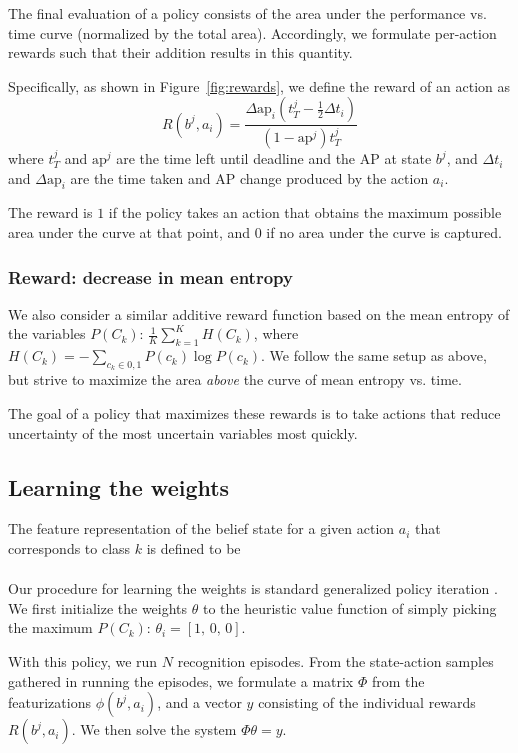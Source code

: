 The final evaluation of a policy consists of the area under the performance vs. time curve (normalized by the total area).
Accordingly, we formulate per-action rewards such that their addition results in this quantity.

Specifically, as shown in Figure~\ref{fig:rewards}, we define the reward of an action as
\begin{equation}\label{eq:advanced}
R(b^j,a_i) = \frac{\Delta \text{ap}_i (t_T^j-\frac{1}{2}\Delta t_i)}{(1-\text{ap}^j)t_T^j}
\end{equation}
where $t_T^j$ and $\text{ap}^j$ are the time left until deadline and the AP at state $b^j$, and $\Delta t_i$ and $\Delta \text{ap}_i$ are the time taken and AP change produced by the action $a_i$.

The reward is $1$ if the policy takes an action that obtains the maximum possible area under the curve at that point, and $0$ if no area under the curve is captured.

\subsubsection{Reward: decrease in mean entropy}
We also consider a similar additive reward function based on the mean entropy of the variables $P(C_k)$: $\frac{1}{K}\sum_{k=1}^K H(C_k)$, where $H(C_k) = - \sum_{c_k \in {0,1}} P(c_k) \log P(c_k)$.
We follow the same setup as above, but strive to maximize the area \emph{above} the curve of mean entropy vs. time.

The goal of a policy that maximizes these rewards is to take actions that reduce uncertainty of the most uncertain variables most quickly.

\subsection{Learning the weights}

The feature representation of the belief state for a given action $a_i$ that corresponds to class $k$ is defined to be
\begin{align}
[P(C_k), \, H(C_k), \, 1]
\end{align}

Our procedure for learning the weights is standard generalized policy iteration \cite{Sutton1998}.
We first initialize the weights $\theta$ to the heuristic value function of simply picking the maximum $P(C_k)$: $\theta_i = [1, \,0, \,0]$.

With this policy, we run $N$ recognition episodes.
From the state-action samples gathered in running the episodes, we formulate a matrix $\Phi$ from the featurizations $\phi(b^j,a_i)$, and a vector $y$ consisting of the individual rewards $R(b^j,a_i)$.
We then solve the system $\Phi \theta = y$.



